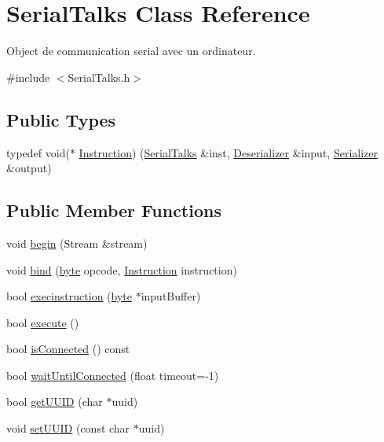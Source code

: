 \hypertarget{class_serial_talks}{}\section{Serial\+Talks Class Reference}
\label{class_serial_talks}


Object de communication serial avec un ordinateur.  




{\ttfamily \#include $<$Serial\+Talks.\+h$>$}

\subsection*{Public Types}
\begin{DoxyCompactItemize}
\item 
typedef void($\ast$ \hyperlink{class_serial_talks_a35ccf86c63ad45fb719e81b0c8db2f13}{Instruction}) (\hyperlink{class_serial_talks}{Serial\+Talks} \&inst, \hyperlink{struct_deserializer}{Deserializer} \&input, \hyperlink{struct_serializer}{Serializer} \&output)
\end{DoxyCompactItemize}
\subsection*{Public Member Functions}
\begin{DoxyCompactItemize}
\item 
void \hyperlink{class_serial_talks_ad66e8c5cd4d3ae3e63f70884dba3ce12}{begin} (Stream \&stream)
\item 
void \hyperlink{class_serial_talks_a484c56fb8d8619a58435a001dca6f0ba}{bind} (\hyperlink{serialutils_8h_a0c8186d9b9b7880309c27230bbb5e69d}{byte} opcode, \hyperlink{class_serial_talks_a35ccf86c63ad45fb719e81b0c8db2f13}{Instruction} instruction)
\item 
bool \hyperlink{class_serial_talks_a31aac8c9995468cf9b1308264bc077ae}{execinstruction} (\hyperlink{serialutils_8h_a0c8186d9b9b7880309c27230bbb5e69d}{byte} $\ast$input\+Buffer)
\item 
bool \hyperlink{class_serial_talks_a9bd8eaff71cfcf33f489e86d3326435c}{execute} ()
\item 
bool \hyperlink{class_serial_talks_a02d73ff9cbb4c44e2e9ba36f97714c9d}{is\+Connected} () const
\item 
bool \hyperlink{class_serial_talks_a1cf3e5668f7a1d1cd1296535ef011528}{wait\+Until\+Connected} (float timeout=-\/1)
\item 
bool \hyperlink{class_serial_talks_a61f0840f12d804ea107ebb98abdc5964}{get\+U\+U\+ID} (char $\ast$uuid)
\item 
void \hyperlink{class_serial_talks_a66e896e6d974c4e4eb9ed890b15c38c1}{set\+U\+U\+ID} (const char $\ast$uuid)
\end{DoxyCompactItemize}
